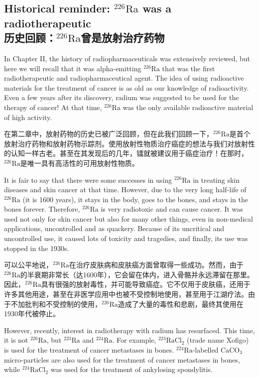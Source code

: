 \documentclass[dvipsnames, svgnames,a4paper,11pt]{article}
\begin{document}
\subsection{Historical reminder: \(\mathrm{^{226}Ra}\) was a radiotherapeutic\\ 历史回顾：\(\mathrm{^{226}Ra}\)曾是放射治疗药物}  

In Chapter II, the history of radiopharmaceuticals was extensively reviewed, but here we will recall that it was alpha-emitting \(\mathrm{^{226}Ra}\) that was the first radiotherapeutic and radiopharmaceutical agent. The idea of using radioactive materials for the treatment of cancer is as old as our knowledge of radioactivity. Even a few years after its discovery, radium was suggested to be used for the therapy of cancer! At that time, \(\mathrm{^{226}Ra}\) was the only available radioactive material of high activity.  

在第二章中，放射药物的历史已被广泛回顾，但在此我们回顾一下，\(\mathrm{^{226}Ra}\)是首个放射治疗药物和放射药物示踪剂。使用放射性物质治疗癌症的想法与我们对放射性的认知一样古老。甚至在其发现后的几年，镭就被建议用于癌症治疗！在那时，\(\mathrm{^{226}Ra}\)是唯一具有高活性的可用放射性物质。  

It is fair to say that there were some successes in using \(\mathrm{^{226}Ra}\) in treating skin diseases and skin cancer at that time. However, due to the very long half-life of \(\mathrm{^{226}Ra}\) (it is 1600 years), it stays in the body, goes to the bones, and stays in the bones forever. Therefore, \(\mathrm{^{226}Ra}\) is very radiotoxic and can cause cancer. It was used not only for skin cancer but also for many other things, even in non-medical applications, uncontrolled and as quackery. Because of its uncritical and uncontrolled use, it caused lots of toxicity and tragedies, and finally, its use was stopped in the 1930s.  

可以公平地说，\(\mathrm{^{226}Ra}\)在治疗皮肤病和皮肤癌方面曾取得一些成功。然而，由于\(\mathrm{^{226}Ra}\)的半衰期非常长（达1600年），它会留在体内，进入骨骼并永远滞留在那里。因此，\(\mathrm{^{226}Ra}\)具有很强的放射毒性，并可能导致癌症。它不仅用于皮肤癌，还用于许多其他用途，甚至在非医学应用中也被不受控制地使用，甚至用于江湖疗法。由于不加批判和不受控制的使用，\(\mathrm{^{226}Ra}\)造成了大量的毒性和悲剧，最终其使用在1930年代被停止。  

However, recently, interest in radiotherapy with radium has resurfaced. This time, it is not \(\mathrm{^{226}Ra}\), but \(\mathrm{^{223}Ra}\) and \(\mathrm{^{224}Ra}\). For example, \(\mathrm{^{223}RaCl_2}\) (trade name Xofigo) is used for the treatment of cancer metastases in bones. \(\mathrm{^{224}Ra}\)-labelled \(\mathrm{CaCO_3}\) micro-particles are also used for the treatment of cancer metastases in bones, while \(\mathrm{^{224}RaCl_2}\) was used for the treatment of ankylosing spondylitis.
\end{document}
